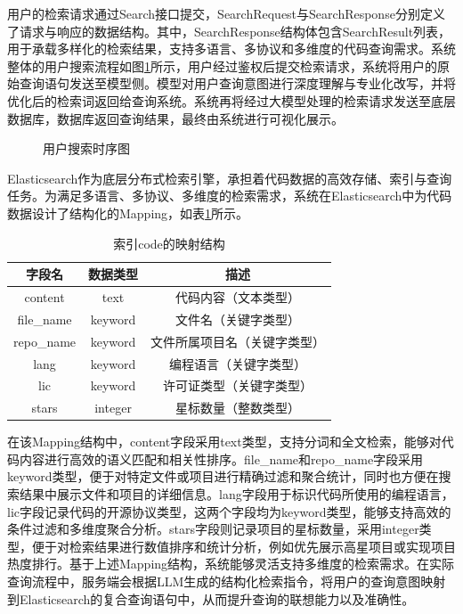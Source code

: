 \documentclass[UTF8,a4paper,12pt]{ctexart}
\numberwithin{equation}{section}
\begin{document}
用户的检索请求通过Search接口提交，SearchRequest与SearchResponse分别定义了请求与响应的数据结构。其中，SearchResponse结构体包含SearchResult列表，用于承载多样化的检索结果，支持多语言、多协议和多维度的代码查询需求。系统整体的用户搜索流程如图\ref{timeline}所示，用户经过鉴权后提交检索请求，系统将用户的原始查询语句发送至模型侧。模型对用户查询意图进行深度理解与专业化改写，并将优化后的检索词返回给查询系统。系统再将经过大模型处理的检索请求发送至底层数据库，数据库返回查询结果，最终由系统进行可视化展示。\par
\begin{figure}[H]
	\caption{用户搜索时序图}
	\label{timeline}
\end{figure}
Elasticsearch作为底层分布式检索引擎，承担着代码数据的高效存储、索引与查询任务。为满足多语言、多协议、多维度的检索需求，系统在Elasticsearch中为代码数据设计了结构化的Mapping，如表\ref{esmapping}所示。
\begin{table}[H]
	\centering
	\caption{索引code的映射结构}
	\label{tab:code_mapping}
	\small
	\begin{tabular}{c c c}
		\toprule
		字段名 & 数据类型 & 描述 \\
		\midrule
		content & text & 代码内容（文本类型） \\
		file\_name & keyword & 文件名（关键字类型） \\
		repo\_name & keyword & 文件所属项目名（关键字类型）\\
		lang & keyword & 编程语言（关键字类型） \\
		lic & keyword & 许可证类型（关键字类型） \\
		stars & integer & 星标数量（整数类型） \\
		\bottomrule
	\end{tabular}
	\label{esmapping}
\end{table}
在该Mapping结构中，content字段采用text类型，支持分词和全文检索，能够对代码内容进行高效的语义匹配和相关性排序。file\_name和repo\_name字段采用keyword类型，便于对特定文件或项目进行精确过滤和聚合统计，同时也方便在搜索结果中展示文件和项目的详细信息。lang字段用于标识代码所使用的编程语言，lic字段记录代码的开源协议类型，这两个字段均为keyword类型，能够支持高效的条件过滤和多维度聚合分析。stars字段则记录项目的星标数量，采用integer类型，便于对检索结果进行数值排序和统计分析，例如优先展示高星项目或实现项目热度排行。基于上述Mapping结构，系统能够灵活支持多维度的检索需求。在实际查询流程中，服务端会根据LLM生成的结构化检索指令，将用户的查询意图映射到Elasticsearch的复合查询语句中，从而提升查询的联想能力以及准确性。
\end{document}
